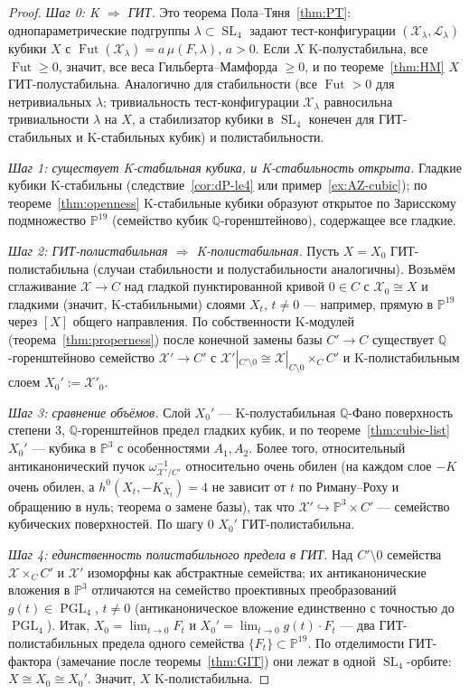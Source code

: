 \documentclass[11pt,a4paper]{article}
\theoremstyle{plain}
\theoremstyle{definition}
\theoremstyle{remark}
\newcommand{\Q}{\mathbb{Q}}
\newcommand{\PP}{\mathbb{P}}
\newcommand{\cL}{\mathcal{L}}
\newcommand{\cX}{\mathcal{X}}
\DeclareMathOperator{\SL}{SL}
\DeclareMathOperator{\PGL}{PGL}
\DeclareMathOperator{\Fut}{Fut}
\begin{document}
\begin{proof}
\emph{Шаг 0: K $\Rightarrow$ ГИТ.} Это теорема Пола--Тяня~\ref{thm:PT}: однопараметрические подгруппы
$\lambda\subset\SL_4$ задают тест-конфигурации $(\cX_\lambda,\cL_\lambda)$ кубики $X$ с
$\Fut(\cX_\lambda)=a\,\mu(F,\lambda)$, $a>0$. Если $X$ K-полустабильна, все $\Fut\ge0$, значит, все
веса Гильберта--Мамфорда $\ge0$, и по теореме~\ref{thm:HM} $X$ ГИТ-полустабильна. Аналогично для
стабильности (все $\Fut>0$ для нетривиальных $\lambda$; тривиальность тест-конфигурации
$\cX_\lambda$ равносильна тривиальности $\lambda$ на $X$, а стабилизатор кубики в $\SL_4$
конечен для ГИТ-стабильных и K-стабильных кубик) и полистабильности.

\emph{Шаг 1: существует K-стабильная кубика, и K-стабильность открыта.} Гладкие кубики K-стабильны
(следствие~\ref{cor:dP-le4} или пример~\ref{ex:AZ-cubic}); по теореме~\ref{thm:openness}
K-стабильные кубики образуют открытое по Зарисскому подмножество $\PP^{19}$ (семейство кубик
$\Q$-горенштейново), содержащее все гладкие.

\emph{Шаг 2: ГИТ-полистабильная $\Rightarrow$ K-полистабильная.} Пусть $X=X_0$ ГИТ-полистабильна
(случаи стабильности и полустабильности аналогичны). Возьмём сглаживание $\cX\to C$ над гладкой
пунктированной кривой $0\in C$ с $\cX_0\cong X$ и гладкими (значит, K-стабильными) слоями $X_t$,
$t\ne0$ --- например, прямую в $\PP^{19}$ через $[X]$ общего направления. По собственности K-модулей
(теорема~\ref{thm:properness}) после конечной замены базы $C'\to C$ существует $\Q$-горенштейново
семейство $\cX'\to C'$ с $\cX'|_{C'\setminus0}\cong\cX|_{C\setminus0}\times_CC'$ и K-полистабильным
слоем $X_0':=\cX'_0$.

\emph{Шаг 3: сравнение объёмов.} Слой $X_0'$ --- K-полустабильная $\Q$-Фано поверхность степени 3,
$\Q$-горенштейнов предел гладких кубик, и по теореме~\ref{thm:cubic-list} $X_0'$ --- кубика в
$\PP^3$ с особенностями $A_1,A_2$. Более того, относительный антиканонический пучок
$\omega_{\cX'/C'}^{-1}$ относительно очень обилен (на каждом слое $-K$ очень обилен, а
$h^0(X_t,-K_{X_t})=4$ не зависит от $t$ по Риману--Роху и обращению в нуль; теорема о замене базы),
так что $\cX'\hookrightarrow\PP^3\times C'$ --- семейство кубических поверхностей. По шагу 0
$X_0'$ ГИТ-полистабильна.

\emph{Шаг 4: единственность полистабильного предела в ГИТ.} Над $C'\setminus0$ семейства
$\cX\times_CC'$ и $\cX'$ изоморфны как абстрактные семейства; их антиканонические вложения в $\PP^3$
отличаются на семейство проективных преобразований $g(t)\in\PGL_4$, $t\ne0$ (антиканоническое
вложение единственно с точностью до $\PGL_4$). Итак, $X_0=\lim_{t\to0}F_t$ и
$X_0'=\lim_{t\to0}g(t)\cdot F_t$ --- два ГИТ-полистабильных предела одного семейства
$\{F_t\}\subset\PP^{19}$. По отделимости ГИТ-фактора (замечание после теоремы~\ref{thm:GIT})
они лежат в одной $\SL_4$-орбите: $X\cong X_0\cong X_0'$. Значит, $X$ K-полистабильна.
\end{proof}
\end{document}

